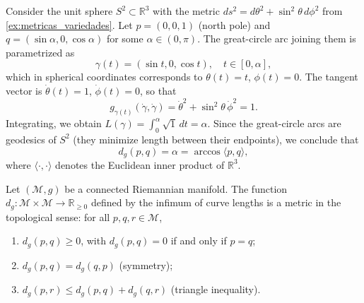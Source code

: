 \begin{example}\label{ex:longitud_esfera}
Consider the unit sphere $S^2 \subset \mathbb{R}^3$ with the metric $ds^2 = d\theta^2 + \sin^2\theta\,d\phi^2$ from \autoref{ex:metricas_variedades}. Let $p = (0,0,1)$ (north pole) and $q = (\sin\alpha, 0, \cos\alpha)$ for some $\alpha \in (0, \pi)$. The great-circle arc joining them is parametrized as
\[
\gamma(t) = (\sin t, 0, \cos t), \quad t \in [0, \alpha],
\]
which in spherical coordinates corresponds to $\theta(t) = t$, $\phi(t) = 0$. The tangent vector is $\dot\theta(t) = 1$, $\dot\phi(t) = 0$, so that
\[
g_{\gamma(t)}(\dot\gamma, \dot\gamma) = \dot\theta^2 + \sin^2\theta\,\dot\phi^2 = 1.
\]
Integrating, we obtain $L(\gamma) = \int_0^\alpha \sqrt{1}\,dt = \alpha$. Since the great-circle arcs are geodesics of $S^2$ (they minimize length between their endpoints), we conclude that
\[
d_g(p, q) = \alpha = \arccos\langle p, q \rangle,
\]
where $\langle \cdot, \cdot \rangle$ denotes the Euclidean inner product of $\mathbb{R}^3$.
\end{example}

\begin{proposition}\label{prop:dg_metrica}
Let $(\mathcal{M}, g)$ be a connected Riemannian manifold. The function $d_g: \mathcal{M} \times \mathcal{M} \to \mathbb{R}_{\geq 0}$ defined by the infimum of curve lengths is a metric in the topological sense: for all $p, q, r \in \mathcal{M}$,
\begin{enumerate}
	\item $d_g(p,q) \geq 0$, with $d_g(p,q) = 0$ if and only if $p = q$;
	\item $d_g(p,q) = d_g(q,p)$ (symmetry);
	\item $d_g(p,r) \leq d_g(p,q) + d_g(q,r)$ (triangle inequality).
\end{enumerate}
\end{proposition}

